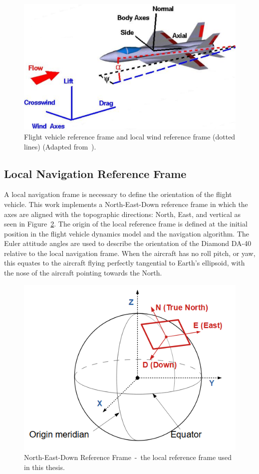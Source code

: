 \documentclass[12pt]{report}
\begin{document}
\begin{figure}[!ht]\label{fig:windframe}
  \centering
  \includegraphics[width=0.75\linewidth]{Figures/windaxes.png}
  \caption{Flight vehicle reference frame and local wind reference frame (dotted lines) (Adapted from~\cite{ForceBalanceCoordinates}).}
\end{figure}

\subsection{Local Navigation Reference Frame}
A local navigation frame is necessary to define the orientation of the flight vehicle. This work implements a North-East-Down reference frame in which the axes are aligned with the topographic directions: North, East, and vertical as seen in Figure~\ref{fig:NEDframe}. The origin of the local reference frame is defined at the initial position in the flight vehicle dynamics model and the navigation algorithm. The Euler attitude angles are used to describe the orientation of the Diamond DA-40 relative to the local navigation frame. When the aircraft has no roll pitch, or yaw, this equates to the aircraft flying perfectly tangential to Earth's ellipsoid, with the nose of the aircraft pointing towards the North.

\begin{figure}[!ht]\label{fig:NEDframe}
  \centering
  \includegraphics[width=0.75\linewidth]{Figures/nedframe.PNG}
  \caption{North-East-Down Reference Frame~-~the local reference frame used in this thesis.}
\end{figure}
\end{document}
